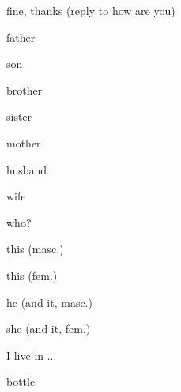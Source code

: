 \begin{flashcard}{\LARGE fine, thanks (reply to how are you)}
\LARGE {}
\end{flashcard}
\begin{flashcard}{\LARGE father}
\LARGE {}
\end{flashcard}
\begin{flashcard}{\LARGE son}
\LARGE {}
\end{flashcard}
\begin{flashcard}{\LARGE brother}
\LARGE {}
\end{flashcard}
\begin{flashcard}{\LARGE sister}
\LARGE {}
\end{flashcard}
\begin{flashcard}{\LARGE mother}
\LARGE {}
\end{flashcard}
\begin{flashcard}{\LARGE husband}
\LARGE {}
\end{flashcard}
\begin{flashcard}{\LARGE wife}
\LARGE {}
\end{flashcard}
\begin{flashcard}{\LARGE who?}
\LARGE {}
\end{flashcard}
\begin{flashcard}{\LARGE this (masc.)}
\LARGE {}
\end{flashcard}
\begin{flashcard}{\LARGE this (fem.)}
\LARGE {}
\end{flashcard}
\begin{flashcard}{\LARGE he (and it, masc.)}
\LARGE {}
\end{flashcard}
\begin{flashcard}{\LARGE she (and it, fem.)}
\LARGE {}
\end{flashcard}
\begin{flashcard}{\LARGE I live in ...}
\LARGE {}
\end{flashcard}
\begin{flashcard}{\LARGE bottle}
\LARGE {}
\end{flashcard}
